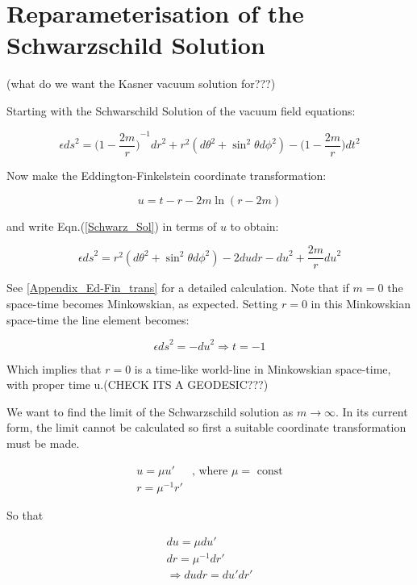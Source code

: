 \section{Reparameterisation of the Schwarzschild Solution}

(what do we want the Kasner vacuum solution for???)

\noindent Starting with the Schwarschild Solution of the vacuum field equations:

\begin{equation}\label{Schwarz_Sol} 
\epsilon {ds}^2 = {\big(1 - \frac{2m}{r}\big)}^{-1} {dr}^{2} + r^2 ({d\theta}^2 + {{\sin}^2 \theta}{d \phi}^2) - \big(1 - \frac{2m}{r}\big) {dt}^2
\end{equation}

\noindent Now make the Eddington-Finkelstein coordinate transformation:

\begin{equation}\label{Ed-Fin_trans}
u = t - r - 2m \ln(r - 2m)
\end{equation}

\noindent and write Eqn.(\ref{Schwarz_Sol}) in terms of $u$ to obtain:

\begin{equation*} 
\epsilon {ds}^{2} = r^2 ({d\theta}^2 + {{\sin}^2 \theta}{d \phi}^2) - 2 du dr - {du}^{2} + \frac{2m}{r} {du}^{2} 
\end{equation*}

\noindent See \ref{Appendix_Ed-Fin_trans} for a detailed calculation. Note that if $m = 0$ the space-time becomes Minkowskian, as expected. Setting $r = 0$ in this Minkowskian space-time the line element becomes:

$$ \epsilon {ds}^2 = - {du}^{2} \Rightarrow t = -1$$

\noindent Which implies that $r = 0$ is a time-like world-line in Minkowskian space-time, with proper time u.(CHECK ITS A GEODESIC???)

We want to find the limit of the Schwarzschild solution as $m \rightarrow \infty$. In its current form, the limit cannot be calculated so first a suitable coordinate transformation must be made. 

\begin{eqnarray*} 
u = \mu u'        & \text{, where }  \mu = \text{ const}\\
r = {\mu}^{-1} r' & 
\end{eqnarray*} 

\noindent So that
  
\begin{eqnarray*} 
du = \mu du' \\
dr = {\mu}^{-1} dr' \\
\Rightarrow du dr = du' dr'
\end{eqnarray*} 


